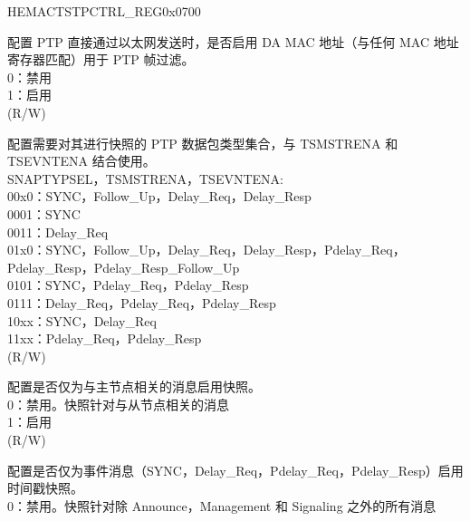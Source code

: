 \begin{register}{H}{EMACTSTPCTRL\_REG}{0x0700}\label{regdesc:EMACTIMESTAMPCONTROLREG}
%
%
%
%
%
%
%
%
%
%
%
%
%
%
%
%
%
%
\regnewline%
\begin{regdesc}\begin{reglist}
\item [TSENMACADDR] 配置 PTP 直接通过以太网发送时，是否启用 DA MAC 地址（与任何 MAC 地址寄存器匹配）用于 PTP 帧过滤。\\
0：禁用\\
1：启用\\(R/W)
\item [SNAPTYPSEL] 配置需要对其进行快照的 PTP 数据包类型集合，与 TSMSTRENA 和 TSEVNTENA 结合使用。\\
SNAPTYPSEL，TSMSTRENA，TSEVNTENA:\\
00x0：SYNC，Follow\_Up，Delay\_Req，Delay\_Resp\\
0001：SYNC\\
0011：Delay\_Req\\
01x0：SYNC，Follow\_Up，Delay\_Req，Delay\_Resp，Pdelay\_Req，Pdelay\_Resp，Pdelay\_Resp\_Follow\_Up\\
0101：SYNC，Pdelay\_Req，Pdelay\_Resp\\
0111：Delay\_Req，Pdelay\_Req，Pdelay\_Resp\\
10xx：SYNC，Delay\_Req\\
11xx：Pdelay\_Req，Pdelay\_Resp\\
(R/W)
\item [TSMSTRENA] 配置是否仅为与主节点相关的消息启用快照。\\
0：禁用。快照针对与从节点相关的消息\\
1：启用\\(R/W)
\item [TSEVNTENA] 配置是否仅为事件消息（SYNC，Delay\_Req，Pdelay\_Req，Pdelay\_Resp）启用时间戳快照。\\
0：禁用。快照针对除 Announce，Management 和 Signaling 之外的所有消息\\

\end{reglist}
\end{regdesc}
\end{register}
